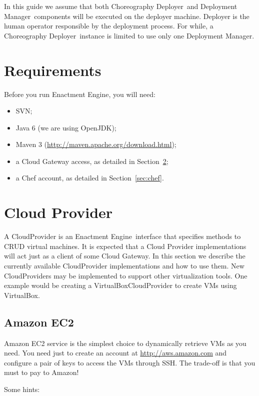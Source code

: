 \documentclass[a4paper, 10pt]{article}
\newcommand{\ee}{Enactment Engine}
\newcommand{\cd}{Choreography Deployer}
\newcommand{\dm}{Deployment Manager}
\begin{document}
In this guide we assume that both \cd\ and \dm\ components will be executed on the deployer machine. Deployer is the human operator responsible by the deployment process. For while, a \cd\ instance is limited to use only one \dm.

\section{Requirements}

Before you run \ee, you will need:

\begin{itemize}
\item SVN;
\item Java 6 (we are using OpenJDK);
\item Maven 3  (\url{http://maven.apache.org/download.html});
\item a Cloud Gateway access, as detailed in Section~\ref{sec:cloud};
\item a Chef account, as detailed in Section~\ref{sec:chef}.
\end{itemize}

\section{Cloud Provider}
\label{sec:cloud}

A \textsf{CloudProvider} is an \ee\ interface that specifies methods to CRUD virtual machines. It is expected that a \textsf{Cloud Provider} implementations will act just as a client of some Cloud Gateway. In this section we describe the currently available \textsf{CloudProvider} implementations and how to use them. New \textsf{CloudProvider}s may be implemented to support other virtualization tools. One example would be creating a \textsf{VirtualBoxCloudProvider} to create VMs using VirtualBox.

\subsection{Amazon EC2}

Amazon EC2 service is the simplest choice to dynamically retrieve VMs as you need. You need just to create an account at \url{http://aws.amazon.com} and configure a pair of keys to access the VMs through SSH. The trade-off is that you must to pay to Amazon! 

Some hints:
\end{document}
